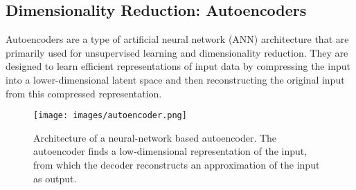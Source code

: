 \documentclass{article}
\begin{document}
%
%
%





\subsection{Dimensionality Reduction: Autoencoders}

Autoencoders \cite{autoencoders} are a type of artificial neural network (ANN) architecture that are primarily used for unsupervised learning and dimensionality reduction. They are designed to learn efficient representations of input data by compressing the input into a lower-dimensional latent space and then reconstructing the original input from this compressed representation.
\begin{figure}
	\centering
	\texttt{[image: images/autoencoder.png]}
	\caption{Architecture of a neural-network based autoencoder. The autoencoder finds a low-dimensional representation of the input, from which the decoder reconstructs an approximation of the input as output.}	
\end{figure}
\\
\end{document}
